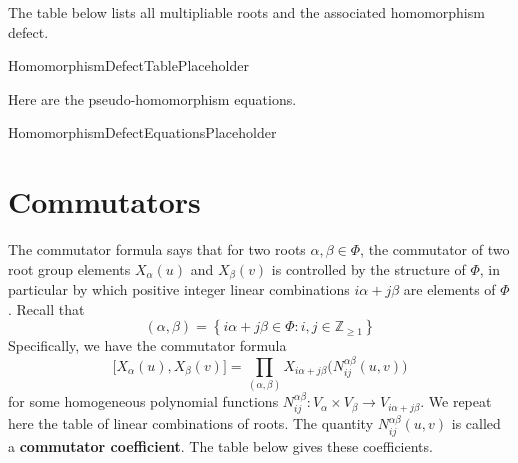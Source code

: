 \documentclass[11pt]{article}
\newcommand{\noi}{\noindent}
\newcommand{\tbf}{\textbf}
\newcommand{\lb}{\left\{}
\newcommand{\rb}{\right\}}
\newcommand{\Z}{\mathbb{Z}}
\theoremstyle{definition}
\newif\ifrootsystemreduced
\newif\ifsummablepairs
\begin{document}
\ifrootsystemreduced
Since the root system for this group is reduced, there are no multipliable roots and the product is always empty, hence each $X_\alpha$ is a group homomorphism there are no homomorphism defect coefficients.
\else
The table below lists all multipliable roots and the associated homomorphism defect.

\bigskip

HomomorphismDefectTablePlaceholder

\bigskip

\noi Here are the pseudo-homomorphism equations.

HomomorphismDefectEquationsPlaceholder

\fi

\newpage
\section{Commutators}

The commutator formula says that for two roots $\alpha, \beta \in \Phi$, the commutator of two root group elements $X_\alpha(u)$ and $X_\beta(v)$ is controlled by the structure of $\Phi$, in particular by which positive integer linear combinations $i\alpha + j\beta$ are elements of $\Phi$. Recall that
\[
	(\alpha, \beta) = \lb i \alpha + j\beta \in \Phi : i, j \in \Z_{\ge 1} \rb
\]
Specifically, we have the commutator formula
\[
	\Big[ X_\alpha(u), X_\beta(v) \Big] = \prod_{(\alpha, \beta)} X_{i\alpha + j\beta} \Big( N_{ij}^{\alpha \beta}(u,v) \Big)
\]
for some homogeneous polynomial functions $N_{ij}^{\alpha \beta}:V_{\alpha} \times V_{\beta} \to V_{i\alpha+j\beta}$. 
\ifsummablepairs
We repeat here the table of linear combinations of roots. The quantity $N_{ij}^{\alpha \beta}(u,v)$ is called a \tbf{commutator coefficient}. The table below gives these coefficients.

\bigskip
\end{document}
